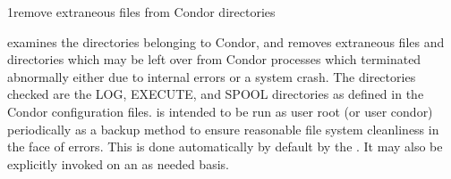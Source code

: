 \begin{ManPage}{}{1}{remove extraneous files from Condor directories}
\label{man-condor-preen}
\Synopsis {}

\Description 

 examines the directories belonging to Condor, 
and removes extraneous files and directories which may be left over from
Condor processes which terminated abnormally either due to internal errors or
a system crash. The directories checked are the LOG, EXECUTE, and SPOOL
directories as defined in the Condor configuration files.  is
intended to be run as user root (or user condor) periodically as a backup
method to ensure reasonable file system cleanliness in the face of
errors. This is done automatically by default by the . 
It may also be explicitly invoked on an as needed basis.

\begin{Options}




\end{Options}

\end{ManPage}
